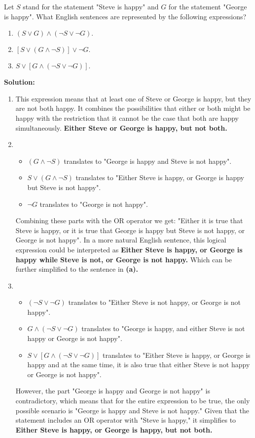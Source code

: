 Let $S$ stand for the statement  "Steve is happy" and $G$ for the statement "George is happy". What English sentences are represented by the following expressions? 

\begin{enumerate}[label=(\alph*)]
    \item $(S \vee G) \wedge (\neg S \vee \neg G).$
    \item $[S \vee (G \wedge \neg S)] \vee \neg G.$
    \item $S \vee [G \wedge (\neg S \vee \neg G)].$
\end{enumerate}    

\textbf{Solution:}
\begin{enumerate}[label=(\alph*)]
    \item  This expression means that at least one of Steve or George is happy, but they are not both happy. It combines the possibilities that either or both might be happy with the restriction that it cannot be the case that both are happy simultaneously. \textbf{Either Steve or George is happy, but not both.}

    \item \begin{itemize}
        \item $(G \wedge \neg S)$ translates to "George is happy and Steve is not happy".
        \item $S \vee (G \wedge \neg S)$ translates to "Either Steve is happy, or George is happy but Steve is not happy".
        \item $\neg G$ translates to "George is not happy".
    \end{itemize} Combining these parts with the OR operator we get: "Either it is true that Steve is happy, or it is true that George is happy but Steve is not happy, or George is not happy". In a more natural English sentence, this logical expression could be interpreted as \textbf{Either Steve is happy, or George is happy while Steve is not, or George is not happy.} Which can be further simplified to the sentence in \textbf{(a).}
  
    \item \begin{itemize}
        \item $(\neg S \vee \neg G)$ translates to "Either Steve is not happy, or George is not happy".
        \item $G \wedge (\neg S \vee \neg G)$ translates to "George is happy, and either Steve is not happy or George is not happy". 
        \item $S \vee [G \wedge (\neg S \vee \neg G)]$ translates to "Either Steve is happy, or George is happy and at the same time, it is also true that either Steve is not happy or George is not happy".
    \end{itemize} However, the part "George is happy and George is not happy" is contradictory, which means that for the entire expression to be true, the only possible scenario is "George is happy and Steve is not happy." Given that the statement includes an OR operator with "Steve is happy," it simplifies to \textbf{Either Steve is happy, or George is happy, but not both.}


\end{enumerate}
